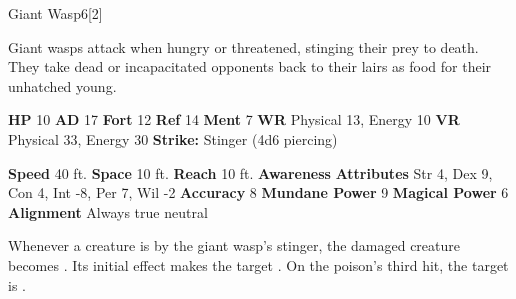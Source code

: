   \begin{monsection}{Giant Wasp}{6}[2]
    \vspace{-1em}\vspace{-1em}
    \vspace{0em}

    
      Giant wasps attack when hungry or threatened, stinging their prey to death.
      They take dead or incapacitated opponents back to their lairs as food for their unhatched young.
    
    

    \begin{spellcontent}
      \begin{spelltargetinginfo}
        \pari \textbf{HP} 10 \monsep
          \textbf{AD} 17 \monsep
          \textbf{Fort} 12 \monsep
          \textbf{Ref} 14 \monsep
          \textbf{Ment} 7
        \pari \textbf{WR} Physical 13, Energy 10 \monsep
        \textbf{VR} Physical 33, Energy 30
        \pari \textbf{Strike:}
            Stinger  (4d6 piercing)
      \end{spelltargetinginfo}
    \end{spellcontent}
    \begin{monsterfooter}
      \pari \textbf{Speed} 40 ft. \monsep
        \textbf{Space} 10 ft. \monsep
        \textbf{Reach} 10 ft.
      \pari \textbf{Awareness} 
      \pari \textbf{Attributes}
        Str 4, Dex 9,
        Con 4, Int -8,
        Per 7, Wil -2
      \pari \textbf{Accuracy} 8 \monsep
        \textbf{Mundane Power} 9 \monsep
      \textbf{Magical Power} 6
      \pari \textbf{Alignment} Always true neutral
    \end{monsterfooter}
  \end{monsection}
    Whenever a creature is  by the giant wasp's stinger,
      the damaged creature becomes .
    Its initial effect makes the target .
    On the poison's third hit, the target is .
  
